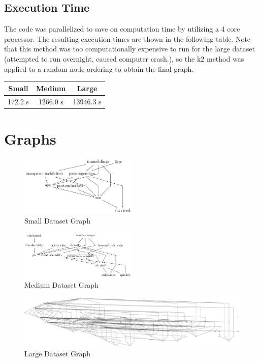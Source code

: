 \documentclass[twoside,11pt]{article}
\begin{document}
\subsection{Execution Time}
The code was parallelized to save on computation time by utilizing a 4 core processor. The resulting execution times are shown in the following table. Note that this method was too computationally expensive to run for the large dataset (attempted to run overnight, caused computer crash.), so the k2 method was applied to a random node ordering to obtain the final graph.

\begin{table}[!h]
\centering
\begin{tabular}{c|c|c}
     Small & Medium & Large  \\ \hline
     172.2 s & 1266.0 s & 13946.3 s 
\end{tabular}
\end{table}
\section{Graphs}

\begin{figure}[h]
    \centering
    \includegraphics[width=0.5\textwidth]{../output/small/small.pdf}
    \caption{Small Dataset Graph}
\end{figure}

\begin{figure}[h]
    \centering
    \includegraphics[width=0.5\textwidth]{../output/medium/medium.pdf}
    \caption{Medium Dataset Graph}
\end{figure}

\begin{figure}[h]
    \centering
    \includegraphics[width=\textwidth]{../output/large/large.pdf}
    \caption{Large Dataset Graph}
\end{figure}
\end{document}
